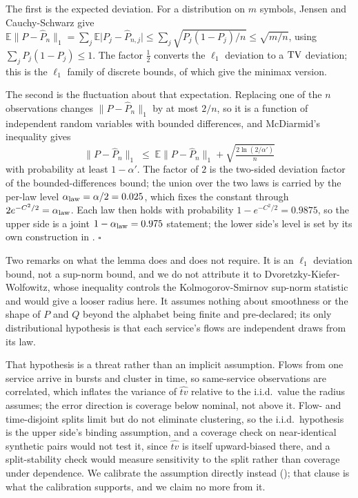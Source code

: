 The first is the expected deviation. For a distribution on $m$ symbols, Jensen
and Cauchy-Schwarz give
$\mathbb{E}\lVert P - \widehat{P}_n\rVert_1
= \sum_j \mathbb{E}\lvert P_j - \widehat{P}_{n,j}\rvert
\le \sum_j \sqrt{P_j(1-P_j)/n} \le \sqrt{m/n}$,
using $\sum_j P_j(1-P_j) \le 1$. The factor $\tfrac12$ converts the $\ell_1$
deviation to a $\mathrm{TV}$ deviation; this is the $\ell_1$ family of discrete bounds,
of which \citet{han2015l1distribution} give the minimax version.

The second is the fluctuation about that expectation. Replacing one of the $n$
observations changes $\lVert P - \widehat{P}_n\rVert_1$ by at most $2/n$, so it
is a function of independent random variables with bounded differences, and
McDiarmid's inequality gives
\begin{equation}
  \lVert P - \widehat{P}_n\rVert_1
  \;\le\; \mathbb{E}\lVert P - \widehat{P}_n\rVert_1
  + \sqrt{\tfrac{2\ln(2/\alpha')}{n}}
  \label{eq:mcdiarmid}
\end{equation}
with probability at least $1-\alpha'$. The factor of $2$ is the two-sided
deviation factor of the bounded-differences bound; the union over the two laws is
carried by the per-law level $\alpha_{\mathrm{law}} = \alpha/2 = 0.025$, which fixes the
constant through $2e^{-C^{2}/2} = \alpha_{\mathrm{law}}$. Each law then holds with probability
$1 - e^{-C^{2}/2} = 0.9875$, so the upper side is a joint $1 - \alpha_{\mathrm{law}} = 0.975$
statement; the lower side's level is set by its own construction in
. $\square$

Two remarks on what the lemma does and does not require. It is an $\ell_1$
deviation bound, not a sup-norm bound, and we do not attribute it to
Dvoretzky-Kiefer-Wolfowitz, whose inequality controls the Kolmogorov-Smirnov
sup-norm statistic and would give a looser radius here. It assumes nothing about
smoothness or the shape of $P$ and $Q$ beyond the alphabet being finite and
pre-declared; its only distributional hypothesis is that each service's flows are
independent draws from its law.

That hypothesis is a threat rather than an implicit assumption. Flows from one
service arrive in bursts and cluster in time, so same-service observations are
correlated, which inflates the variance of $\widehat{tv}$ relative to the
i.i.d.\ value the radius assumes; the error direction is coverage below nominal,
not above it. Flow- and time-disjoint splits limit but do not eliminate
clustering, so the i.i.d.\ hypothesis is the upper side's binding assumption, and
a coverage check on near-identical synthetic pairs would not test it, since
$\widehat{tv}$ is itself upward-biased there, and a split-stability check would
measure sensitivity to the split rather than coverage under dependence. We
calibrate the assumption directly instead ();
that clause is what the calibration supports, and we claim no more from it.

